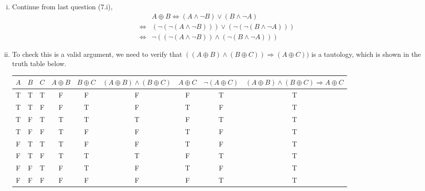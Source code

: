 \documentclass{article}[12pt]
\begin{document}
\begin{enumerate}[(i)]
\begin{table}[H]
\end{table}
\item Continue from last question (7.i),
\begin{align*}
&A\oplus B \Longleftrightarrow (A\wedge \neg B)\vee (B\wedge \neg A)\\
\Longleftrightarrow & (\neg (\neg  (A\wedge \neg B)))\vee (\neg (\neg  (B\wedge \neg A)))\\
\Longleftrightarrow & \neg ((\neg  (A\wedge \neg B))\wedge  (\neg  (B\wedge \neg A)))
\end{align*}
\item To check this is a valid argument, we need to verify that $((A\oplus B)\wedge (B\oplus C))\Longrightarrow (A\oplus C))$  is a tautology, which is shown in the truth table below.
\begin{table}[H]\centering
\begin{tabular}{c|c|c||c|c||c||c|c|||c}
$A$ & $B$ & $C$ & $A \oplus B$ & $B \oplus C$ & $(A \oplus B) \wedge (B \oplus C)$ & $A \oplus C$ & $\neg (A \oplus C)$ & $(A \oplus B) \wedge (B \oplus C)\Longrightarrow A \oplus C$ \\ \hline
T   & T   & T   & F            & F            & F                                  & F            & T                   & T                                                           \\
T   & T   & F   & F            & T            & F                                  & T            & F                   & T                                                           \\
T   & F   & T   & T            & T            & T                                  & F            & T                   & T                                                           \\
T   & F   & F   & T            & F            & F                                  & T            & F                   & T                                                           \\
F   & T   & T   & T            & F            & F                                  & T            & F                   & T                                                           \\
F   & T   & F   & T            & T            & T                                  & F            & T                   & T                                                           \\
F   & F   & T   & F            & T            & F                                  & T            & F                   & T                                                           \\
F   & F   & F   & F            & F            & F                                  & F            & T                   & T                                                          
\end{tabular}
\end{table}

\end{enumerate}
\end{document}
